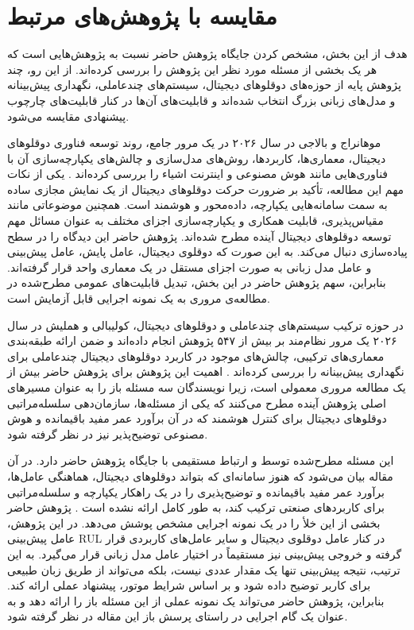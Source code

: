 \section{مقایسه با پژوهش‌های مرتبط}
\label{sec:comparison}

هدف از این بخش، مشخص کردن جایگاه پژوهش حاضر نسبت به پژوهش‌هایی است که هر یک بخشی از مسئله مورد نظر این پژوهش را بررسی کرده‌اند. از این رو، چند پژوهش پایه از حوزه‌های دوقلوهای دیجیتال، سیستم‌های چندعاملی، نگهداری پیش‌بینانه و مدل‌های زبانی بزرگ انتخاب شده‌اند و قابلیت‌های آن‌ها در کنار قابلیت‌های چارچوب پیشنهادی مقایسه می‌شود.

موهانراج
 و
بالاجی
در سال ۲۰۲۶ در یک مرور جامع، روند توسعه فناوری
دوقلوهای دیجیتال، معماری‌ها، کاربردها، روش‌های مدل‌سازی و چالش‌های
یکپارچه‌سازی آن با فناوری‌هایی مانند هوش مصنوعی و اینترنت اشیاء را
بررسی کرده‌اند \cite{mohanraj2026digitaltwin}. یکی از نکات مهم این
مطالعه، تأکید بر ضرورت حرکت دوقلوهای دیجیتال از یک نمایش مجازی ساده به
سمت سامانه‌هایی یکپارچه، داده‌محور و هوشمند است. همچنین موضوعاتی مانند
مقیاس‌پذیری، قابلیت همکاری و یکپارچه‌سازی اجزای مختلف به عنوان مسائل
مهم توسعه دوقلوهای دیجیتال آینده مطرح شده‌اند. پژوهش حاضر این دیدگاه
را در سطح پیاده‌سازی دنبال می‌کند. به این صورت که دوقلوی دیجیتال،
عامل پایش، عامل پیش‌بینی و عامل مدل زبانی به صورت اجزای مستقل در یک معماری واحد قرار گرفته‌اند. بنابراین، سهم پژوهش حاضر
در این بخش، تبدیل قابلیت‌های عمومی مطرح‌شده در مطالعه‌ی مروری به یک
نمونه اجرایی قابل آزمایش است.

در حوزه ترکیب سیستم‌های چندعاملی و دوقلوهای دیجیتال،
کولیبالی
و
هملیش
در سال ۲۰۲۶ یک مرور نظام‌مند بر بیش از ۵۴۷ پژوهش انجام داده‌اند
و ضمن ارائه طبقه‌بندی معماری‌های ترکیبی، چالش‌های موجود در کاربرد
دوقلوهای دیجیتال چندعاملی برای نگهداری پیش‌بینانه را بررسی کرده‌اند
\cite{coulibaly2026madtdt}. اهمیت این پژوهش برای پژوهش حاضر
بیش از یک مطالعه مروری معمولی است، زیرا نویسندگان سه مسئله باز را به
عنوان مسیرهای اصلی پژوهش آینده مطرح می‌کنند که یکی از مسئله‌ها، سازمان‌دهی سلسله‌مراتبی دوقلوهای دیجیتال برای کنترل هوشمند که در آن برآورد عمر مفید باقیمانده و هوش مصنوعی توضیح‌پذیر نیز در نظر گرفته شود.

این مسئله مطرح‌شده توسط 
و
ارتباط مستقیمی با جایگاه
پژوهش حاضر دارد. در آن مقاله بیان می‌شود که هنوز سامانه‌ای که بتواند
دوقلوهای دیجیتال، هماهنگی عامل‌ها، برآورد عمر مفید باقیمانده و
توضیح‌پذیری را در یک راهکار یکپارچه و سلسله‌مراتبی برای کاربردهای
صنعتی ترکیب کند، به طور کامل ارائه نشده است
\cite{coulibaly2026madtdt}. پژوهش حاضر بخشی از این خلأ را در یک
نمونه اجرایی مشخص پوشش می‌دهد. در این پژوهش، عامل پیش‌بینی \gls{RUL} در
کنار عامل دوقلوی دیجیتال و سایر عامل‌های کاربردی قرار گرفته و خروجی
پیش‌بینی نیز مستقیماً در اختیار عامل مدل زبانی قرار می‌گیرد. به این
ترتیب، نتیجه پیش‌بینی تنها یک مقدار عددی نیست، بلکه می‌تواند از طریق زبان طبیعی برای کاربر توضیح داده شود و بر اساس شرایط موتور، پیشنهاد عملی ارائه کند. بنابراین، پژوهش حاضر می‌تواند یک نمونه عملی از این مسئله باز را ارائه دهد و به عنوان یک گام اجرایی در راستای پرسش باز این مقاله در نظر گرفته شود.

